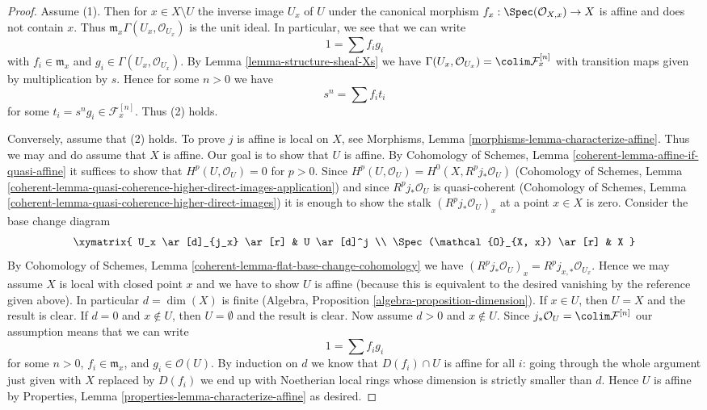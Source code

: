 \begin{proof}
Assume (1). Then for $x \in X \setminus U$ the inverse image $U_x$ of $U$
under the canonical morphism $f_x : \Spec(\mathcal{O}_{X, x}) \to X$ is affine
and does not contain $x$. Thus $\mathfrak m_x \Gamma(U_x, \mathcal{O}_{U_x})$
is the unit ideal. In particular, we see that we can write
$$
1 = \sum f_i g_i
$$
with $f_i \in \mathfrak m_x$ and $g_i \in \Gamma(U_x, \mathcal{O}_{U_x})$.
By Lemma \ref{lemma-structure-sheaf-Xs} we have
$\Gamma(U_x, \mathcal{O}_{U_x}) = \colim \mathcal{F}^{[n]}_x$
with transition maps given by multiplication by $s$.
Hence for some $n > 0$ we have
$$
s^n = \sum f_i t_i
$$
for some $t_i = s^ng_i \in \mathcal{F}^{[n]}_x$. Thus (2) holds.

\medskip\noindent
Conversely, assume that (2) holds. To prove $j$ is affine is local on $X$,
see Morphisms, Lemma \ref{morphisms-lemma-characterize-affine}.
Thus we may and do assume that $X$ is affine. Our goal is to
show that $U$ is affine.
By Cohomology of Schemes, Lemma \ref{coherent-lemma-affine-if-quasi-affine}
it suffices to show that $H^p(U, \mathcal{O}_U) = 0$ for $p > 0$.
Since $H^p(U, \mathcal{O}_U) = H^0(X, R^pj_*\mathcal{O}_U)$
(Cohomology of Schemes, Lemma
\ref{coherent-lemma-quasi-coherence-higher-direct-images-application})
and since $R^pj_*\mathcal{O}_U$ is quasi-coherent
(Cohomology of Schemes, Lemma
\ref{coherent-lemma-quasi-coherence-higher-direct-images})
it is enough to show the stalk $(R^pj_*\mathcal{O}_U)_x$
at a point $x \in X$ is zero. Consider the base change diagram
$$
\xymatrix{
U_x \ar[d]_{j_x} \ar[r] & U \ar[d]^j \\
\Spec(\mathcal{O}_{X, x}) \ar[r] & X
}
$$
By Cohomology of Schemes, Lemma
\ref{coherent-lemma-flat-base-change-cohomology} we have
$(R^pj_*\mathcal{O}_U)_x = R^pj_{x, *}\mathcal{O}_{U_x}$.
Hence we may assume $X$ is local with closed point $x$
and we have to show $U$ is affine (because this is equivalent to
the desired vanishing by the reference given above).
In particular $d = \dim(X)$ is finite
(Algebra, Proposition \ref{algebra-proposition-dimension}).
If $x \in U$, then $U = X$ and the result is clear.
If $d = 0$ and $x \not \in U$, then $U = \emptyset$
and the result is clear. Now assume $d > 0$ and $x \not \in U$.
Since $j_*\mathcal{O}_U = \colim \mathcal{F}^{[n]}$
our assumption means that we can write
$$
1 = \sum f_i g_i
$$
for some $n > 0$, $f_i \in \mathfrak m_x$, and $g_i \in \mathcal{O}(U)$.
By induction on $d$ we know that $D(f_i) \cap U$ is affine
for all $i$: going through the whole argument just given with
$X$ replaced by $D(f_i)$ we end up with Noetherian local rings
whose dimension is strictly smaller than $d$. Hence $U$
is affine by Properties, Lemma \ref{properties-lemma-characterize-affine}
as desired.
\end{proof}





